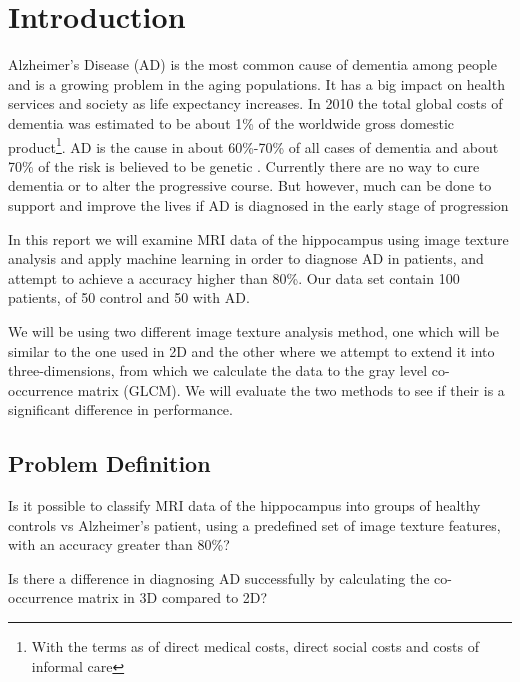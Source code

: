 \chapter{Introduction}

Alzheimer's Disease (AD) is the most common cause of dementia among people and is a growing problem in the aging populations. It has a big impact on health services and society as life expectancy increases. In 2010 the total global costs of dementia was estimated to be about 1\% of the worldwide gross domestic product\footnote{With the terms as of direct medical costs, direct social costs and costs of informal care}. AD is the cause in about 60\%-70\% of all cases of dementia\cite{Who} and about 70\% of the risk is believed to be genetic \cite{AlzheimerLancet}. Currently there are no way to cure dementia or to alter the progressive course. But however, much can be done to support and improve the lives if AD is diagnosed in the early stage of progression \cite{Who}

In this report we will examine MRI data of the hippocampus using image texture analysis and apply machine learning in order to diagnose AD in patients, and attempt to achieve a accuracy higher than 80\%. Our data set contain 100 patients, of 50 control and 50 with AD.

We will be using two different image texture analysis method, one which will be similar to the one used in 2D\cite{MRfreeborough}\cite{Castellano} and the other where we attempt to extend it into three-dimensions, from which we calculate the data to the gray level co-oc\-curren\-ce matrix (GLCM). We will evaluate the two methods to see if their is a significant difference in performance.

\section{Problem Definition}

Is it possible to classify MRI data of the hippocampus into groups of healthy controls vs Alzheimer's patient, using a predefined set of image texture features, with an accuracy great\-er than 80\%?

Is there a difference in diagnosing AD successfully by calculating the co-occurrence matrix in 3D compared to 2D?


